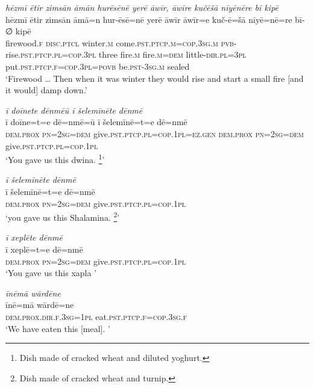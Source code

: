 \ea \label{ŽE.37}
\textit{hēzmī ētir zimsān āmān hurēsēnē yerē āwīr, āwīre kučēšā nīyēnēre bī kipē} \\ 
\gll hēzmī ētir zimsān āmā=n hur-ēsē=nē yerē āwīr āwīr=e kuč-ē=šā nīyē=nē=re bī-∅ kipē \\ 
 firewood\textsc{.f} \textsc{disc}.\textsc{ptcl} winter\textsc{.m} come\textsc{.pst}\textsc{.ptcp}\textsc{.m}\textsc{=cop}\textsc{.3sg}\textsc{.m} \textsc{pvb-}rise\textsc{.pst}\textsc{.ptcp}\textsc{.pl}\textsc{=cop}\textsc{.3pl} three fire\textsc{.m} fire\textsc{.m}\textsc{=dem} little\textsc{-dir}\textsc{.pl}\textsc{=3pl} put\textsc{.pst}\textsc{.ptcp}\textsc{.f}\textsc{=cop}\textsc{.3pl}\textsc{=\textsc{povb}} be\textsc{.pst}\textsc{-3sg}\textsc{.m} sealed \\ 
\glt `Firewood …  Then when it was winter they would rise and start a small fire [and it would] damp down.'
\z 
 
\ea \label{ŽE.50}
\textit{ī doīnete dēnmēū ī šelemīnēte dēnmē} \\ 
\gll ī doīne=t=e dē=nmē=ū ī šelemīnē=t=e dē=nmē \\ 
 \textsc{dem.prox} \textsc{pn}\textsc{=\textsc{2sg}}\textsc{=dem} give\textsc{.pst}\textsc{.ptcp}\textsc{.pl}\textsc{=cop}\textsc{.1pl}\textsc{\textsc{=ez.gen}} \textsc{dem.prox} \textsc{pn}\textsc{=\textsc{2sg}}\textsc{=dem} give\textsc{.pst}\textsc{.ptcp}\textsc{.pl}\textsc{=cop}\textsc{.1pl} \\ 
\glt `You gave us this dwina. \footnote{Dish made of cracked wheat and diluted yoghurt.}'
\z 
 
\ea \label{ŽE.51}
\textit{ī šelemīnēte dēnmē} \\ 
\gll ī šelemīnē=t=e dē=nmē \\ 
 \textsc{dem.prox} \textsc{pn}\textsc{=\textsc{2sg}}\textsc{=dem} give\textsc{.pst}\textsc{.ptcp}\textsc{.pl}\textsc{=cop}\textsc{.1pl} \\ 
\glt `you gave us this Shalamina. \footnote{Dish made of cracked wheat and turnip.}'
\z 
 
\ea \label{ŽE.52}
\textit{ī xeplēte dēnmē} \\ 
\gll ī xeplē=t=e dē=nmē \\ 
 \textsc{dem.prox} \textsc{pn}\textsc{=\textsc{2sg}}\textsc{=dem} give\textsc{.pst}\textsc{.ptcp}\textsc{.pl}\textsc{=cop}\textsc{.1pl} \\ 
\glt `You gave us this xapla '
\z 
 
\ea \label{ŽE.53}
\textit{īnēmā wārdēne} \\ 
\gll īnē=mā wārdē=ne \\ 
 \textsc{dem.prox}\textsc{.dir}\textsc{.f}\textsc{.3sg}\textsc{=1pl} eat\textsc{.pst}\textsc{.ptcp}\textsc{.f}\textsc{=cop}\textsc{.3sg}\textsc{.f} \\ 
\glt `We have eaten this [meal]. '
\z 
 
